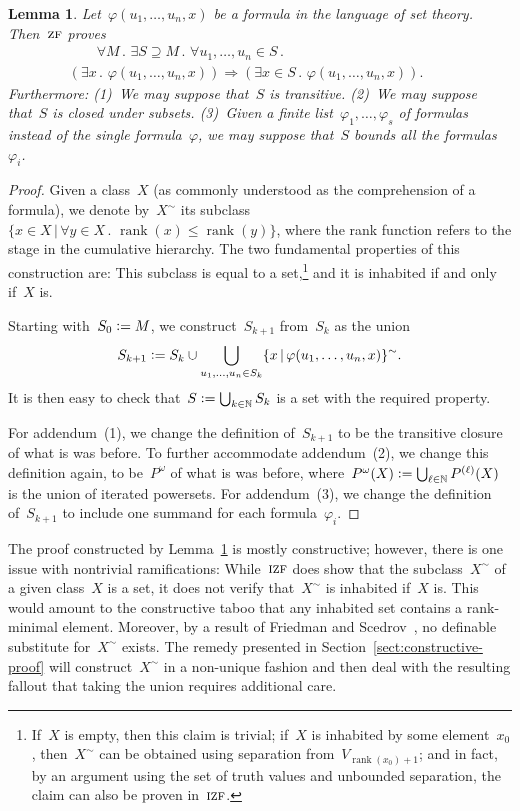 \documentclass[oneside,reqno]{amsart}
\theoremstyle{definition}
\theoremstyle{plain}
\newtheorem{lemma}[defn]{Lemma}
\theoremstyle{remark}
\newcommand{\NN}{\mathbb{N}}
\newcommand{\defeq}{\vcentcolon=}
\DeclareMathOperator{\rank}{rank}
\renewcommand{\_}{\mathpunct{.}\,}
\newcommand{\?}{\,{:}\,}
\newcommand{\ZF}{\textsc{zf}}
\newcommand{\IZF}{\textsc{izf}}
\begin{document}
\begin{lemma}\label{lemma:zf-smallstep}
Let~$\varphi(u_1,\ldots,u_n,x)$ be a formula in the language of set
theory. Then~$\ZF$ proves
\begin{multline*}
  {\qquad}\forall M\_
  \exists S \supseteq M\_
  \forall u_1,\ldots,u_n \in S\_ \\
  (\exists x\_ \varphi(u_1,\ldots,u_n,x)) \Longrightarrow
  (\exists x \in S\_ \varphi(u_1,\ldots,u_n,x)).{\qquad}
\end{multline*}
Furthermore: (1)~We may suppose that~$S$ is transitive. (2)~We may suppose that~$S$ is
closed under subsets. (3)~Given a finite list~$\varphi_1,\ldots,\varphi_s$
of formulas instead of the single formula~$\varphi$, we may suppose that~$S$
bounds all the formulas~$\varphi_i$.
\end{lemma}

\begin{proof}Given a class~$X$ (as commonly understood as the comprehension of
a formula), we denote by~$X^\sim$ its subclass~$\{ x \in X \,|\, \forall y
\in X\_ \rank(x) \leq \rank(y) \}$, where the rank function refers to the stage
in the cumulative hierarchy. The two fundamental properties of this construction are:
This subclass is equal to a set,\footnote{If~$X$ is empty, then
this claim is trivial; if~$X$ is inhabited by some element~$x_0$, then~$X^\sim$ can
be obtained using separation from~$V_{\rank(x_0)+1}$; and in fact, by an argument
using the set of truth values and unbounded separation, the claim can also be
proven in~$\IZF$.} and it is inhabited if and only if~$X$ is.

Starting with~$S_0 \defeq M$, we construct~$S_{k+1}$ from~$S_k$ as the union
\[ S_{k+1} \defeq S_k \cup \bigcup_{u_1,\ldots,u_n \in S_k} \{ x \,|\,
\varphi(u_1,\ldots,u_n,x) \}^\sim. \]
It is then easy to check that~$S \defeq \bigcup_{k \in \NN} S_k$ is a set with the
required property.

For addendum~(1), we change the definition of~$S_{k+1}$ to be the transitive
closure of what is was before. To further accommodate addendum~(2), we change
this definition again, to be~$P^\omega$ of what is was before,
where~$P^\omega(X) \defeq \bigcup_{\ell \in \NN} P^{(\ell)}(X)$ is the union of
iterated powersets. For addendum~(3), we change the definition of~$S_{k+1}$ to
include one summand for each formula~$\varphi_i$.
\end{proof}

The proof constructed by Lemma~\ref{lemma:zf-smallstep} is mostly constructive; however,
there is one issue with nontrivial ramifications: While~$\IZF$ does show
that the subclass~$X^\sim$ of a given class~$X$ is a set, it does not verify
that~$X^\sim$ is inhabited if~$X$ is. This would amount to the constructive
taboo that any inhabited set contains a rank-minimal element. Moreover, by
a result of Friedman and Scedrov~\cite{XXX}, no definable substitute
for~$X^\sim$ exists. The remedy presented in
Section~\ref{sect:constructive-proof} will construct~$X^\sim$ in a non-unique
fashion and then deal with the resulting fallout that taking the union requires
additional care.
\end{document}
